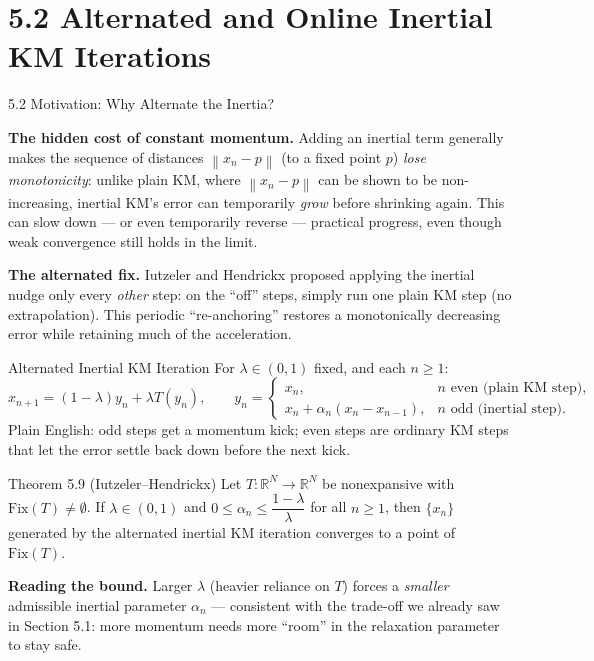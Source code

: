 \documentclass[aspectratio=169,10pt]{beamer}
\newcommand{\norm}[1]{\left\|#1\right\|}
\newcommand{\Fix}{\mathrm{Fix}}
\newcommand{\R}{\mathbb{R}}
\begin{document}
\section{5.2 Alternated and Online Inertial KM Iterations}

\begin{frame}[allowframebreaks]{5.2 Motivation: Why Alternate the Inertia?}

  \textbf{The hidden cost of constant momentum.}  Adding an
  inertial term generally makes the sequence of distances
  $\norm{x_n-p}$ (to a fixed point $p$) \emph{lose monotonicity}:
  unlike plain KM, where $\norm{x_n-p}$ can be shown to be
  non-increasing, inertial KM's error can temporarily \emph{grow}
  before shrinking again. This can slow down --- or even
  temporarily reverse --- practical progress, even though weak
  convergence still holds in the limit.

  \vspace{0.5em}
  \textbf{The alternated fix.}  Iutzeler and Hendrickx proposed
  applying the inertial nudge only every \emph{other} step: on the
  ``off'' steps, simply run one plain KM step (no extrapolation).
  This periodic ``re-anchoring'' restores a monotonically
  decreasing error while retaining much of the acceleration.

  \begin{block}{Alternated Inertial KM Iteration}
    For $\lambda\in(0,1)$ fixed, and each $n\ge1$:
    \[
      x_{n+1}=(1-\lambda)y_n+\lambda T(y_n), \qquad
      y_n=
      \begin{cases}
        x_n, & n\text{ even (plain KM step)},\\
        x_n+\alpha_n(x_n-x_{n-1}), & n\text{ odd (inertial step)}.
      \end{cases}
    \]
    Plain English: odd steps get a momentum kick; even steps are
    ordinary KM steps that let the error settle back down before
    the next kick.
  \end{block}

  \framebreak

  \begin{alertblock}{Theorem 5.9 (Iutzeler--Hendrickx)}
    Let $T:\R^N\to\R^N$ be nonexpansive with $\Fix(T)\neq\emptyset$.
    If $\lambda\in(0,1)$ and
    $0\le\alpha_n\le\dfrac{1-\lambda}{\lambda}$ for all $n\ge1$,
    then $\{x_n\}$ generated by the alternated inertial KM
    iteration converges to a point of $\Fix(T)$.
  \end{alertblock}

  \textbf{Reading the bound.}  Larger $\lambda$ (heavier reliance
  on $T$) forces a \emph{smaller} admissible inertial parameter
  $\alpha_n$ --- consistent with the trade-off we already saw in
  Section 5.1: more momentum needs more ``room'' in the relaxation
  parameter to stay safe.

\end{frame}
\end{document}
